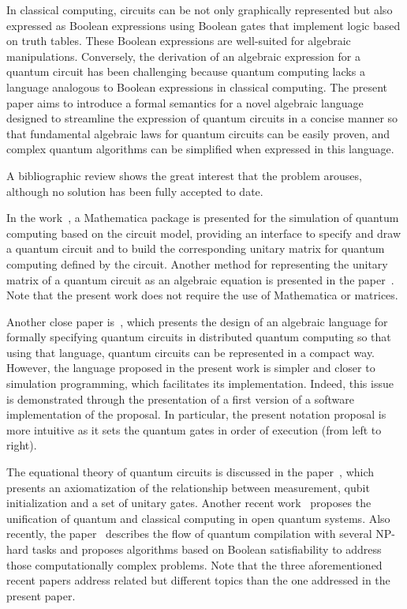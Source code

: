 \documentclass[sigconf,natbib=false]{acmart}
\begin{document}
	In classical computing, circuits can be not only graphically represented but also expressed as Boolean expressions using Boolean gates that implement logic based on truth tables. These Boolean expressions are well-suited for algebraic manipulations. Conversely, the derivation of an algebraic expression for a quantum circuit has been challenging because quantum computing lacks a language analogous to Boolean expressions in classical computing. The present paper aims to introduce a formal semantics for a novel algebraic language designed to streamline the expression of quantum circuits in a concise manner so that fundamental algebraic laws for quantum circuits can be easily proven, and complex quantum algorithms can be simplified when expressed in this language.

	A bibliographic review shows the great interest that the problem arouses, although no solution has been fully accepted to date.

	In the work~\cite{gerdt}, a Mathematica package is presented for the simulation of quantum computing based on the circuit model, providing an interface to specify and draw a quantum circuit and to build the corresponding unitary matrix for quantum computing defined by the circuit.
	Another method for representing the unitary matrix of a quantum circuit as an algebraic equation is presented in the paper~\cite{Hutsell}.
	Note that the present work does not require the use of Mathematica or matrices.

	Another close paper is~\cite{Ying}, which presents the design of an algebraic language for formally specifying quantum circuits in distributed quantum computing so that using that language, quantum circuits can be represented in a compact way. However, the language proposed in the present work is simpler and closer to simulation programming, which facilitates its implementation. Indeed, this issue is demonstrated through the presentation of a first version of a software implementation of the proposal. In particular, the present notation proposal is more intuitive as it sets the quantum gates in order of execution (from left to right).

	The equational theory of quantum circuits is discussed in the paper~\cite{Staton}, which presents an axiomatization of the relationship between measurement, qubit initialization and a set of unitary gates. Another recent work~\cite{Wang19} proposes the unification of quantum and classical computing in open quantum systems.
	Also recently, the paper~\cite{doi:10.1098/rsta.2019.0161} describes the flow of quantum compilation with several NP-hard tasks and proposes algorithms based on Boolean satisfiability to address those computationally complex problems. Note that the three  aforementioned recent papers address related but different topics than the one addressed in the present paper.
\end{document}
